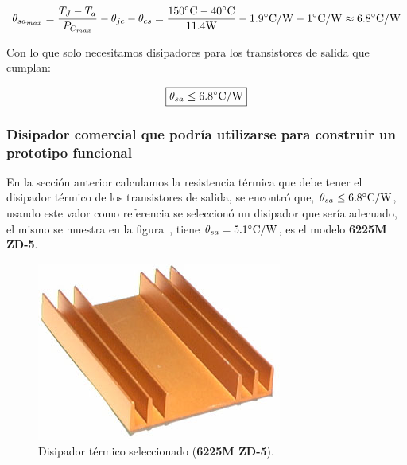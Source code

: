 \begin{equation}
\theta_{sa_{max}} = \frac{T_{J} - T_{a}}{P_{C_{max}}} - \theta_{jc} - \theta_{cs} = \frac{150 \si[per-mode=symbol]{\celsius} - 40 \si[per-mode=symbol]{\celsius}   }{11.4  \si[per-mode=symbol]{\watt} } - 1.9 \si[per-mode=symbol]{\celsius\per\watt} - 1 \si[per-mode=symbol]{\celsius\per\watt} \approx 6.8 \si[per-mode=symbol]{\celsius\per\watt}\\ \\
\end{equation}

Con lo que solo necesitamos disipadores para los transistores de salida que cumplan:

\begin{center}
\begin{equation}
\boxed{ \theta_{sa} \leq 6.8 \si[per-mode=symbol]{\celsius\per\watt} }
\end{equation}
\end{center}

\clearpage

\subsubsection{Disipador comercial que podría utilizarse para construir un prototipo funcional}

En la sección anterior calculamos la resistencia térmica que debe tener el disipador térmico de los transistores de salida, se encontró que, $\theta_{sa} \leq 6.8 \si[per-mode=symbol]{\celsius\per\watt}$, usando este valor como referencia se seleccionó un disipador que sería adecuado, el mismo se muestra en la figura~, tiene $\theta_{sa} = 5.1 \si[per-mode=symbol]{\celsius\per\watt}$, es el modelo \textbf{6225M ZD-5}.

\begin{figure}[H] %
\begin{center}
\includegraphics[width=0.6 \textwidth, angle=0]{./img/desarrollo/10b_6225M_ZD_5.png}
\caption{\label{fig:fig_thermal_dissipator}\footnotesize{Disipador térmico seleccionado (\textbf{6225M ZD-5}).}}
\end{center}
\end{figure}


